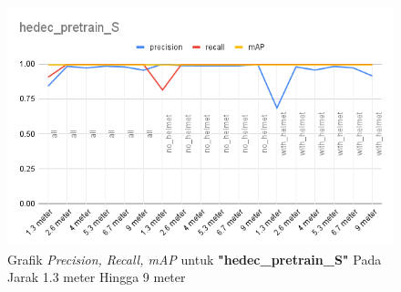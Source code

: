 \begin{enumerate}
  \begin{figure}[h!]
    \centering
    \includegraphics[width=1\textwidth]{gambar/BerdasarkanJarak/hedec_pretrain_S.png}
    \caption{Grafik \emph{Precision, Recall, mAP} untuk \textbf{"hedec\_pretrain\_S"} Pada Jarak 1.3 meter Hingga 9 meter}
    \label{fig:grafvaljarak_hedec_pretrain_S}  
  \end{figure}


\end{enumerate}
